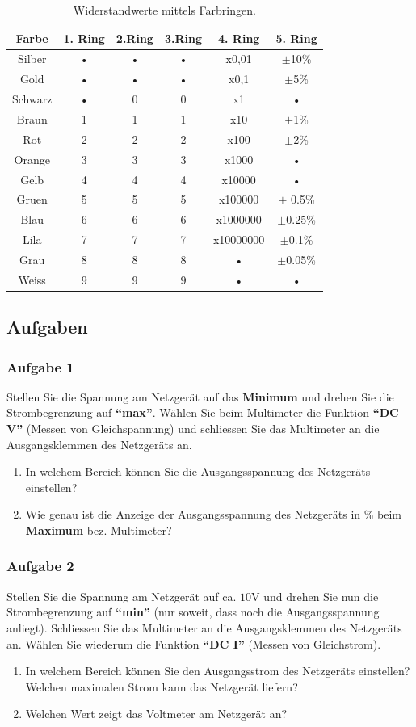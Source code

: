 \begin{table}[H]
\centering
\begin{tabular}{cccccc}\hline
Farbe &1. Ring &2.Ring &3.Ring &4. Ring &5. Ring\\\hline
Silber&•& •& •&x0,01& $\pm$10\%\\
Gold&•& •& •& x0,1& $\pm$5\%\\
Schwarz&•& 0& 0&x1 &•\\
Braun&1& 1& 1&x10& $\pm$1\%\\
Rot&2 &2 &2& x100& $\pm$2\%\\
Orange&3 &3& 3&x1000& •\\
Gelb&4 &4 &4& x10000& •\\
Gruen&5 &5& 5&x100000&$\pm$ 0.5\%\\
Blau&6 &6 &6&x1000000&$\pm$0.25\%\\
Lila&7 &7& 7&x10000000&$\pm$0.1\%\\
Grau&8 &8& 8&•&$\pm$0.05\%\\
Weiss& 9& 9& 9& •& •\\\hline
\end{tabular}
\caption{Widerstandwerte mittels Farbringen.}
\end{table}
\subsection{Aufgaben}
\subsubsection{Aufgabe 1}
Stellen Sie die Spannung am Netzgerät auf das \textbf{Minimum} und drehen Sie die Strombegrenzung auf \textbf{``max''}. Wählen Sie beim Multimeter die Funktion \textbf{``DC V''} (Messen von Gleichspannung) und schliessen Sie das Multimeter an die Ausgangsklemmen des Netzgeräts an. 
\begin{enumerate}[$a)$]
\item In welchem Bereich können Sie die Ausgangsspannung des Netzgeräts einstellen? 
\item Wie genau ist die Anzeige der Ausgangsspannung des Netzgeräts in \% beim \textbf{Maximum} bez. Multimeter?
\end{enumerate}
\subsubsection{Aufgabe 2}
Stellen Sie die Spannung am Netzgerät auf ca. $10\text{V}$ und drehen Sie nun die Strombegrenzung auf \textbf{``min''} (nur soweit, dass noch die Ausgangsspannung anliegt). Schliessen Sie das Multimeter an die Ausgangsklemmen des Netzgeräts an. Wählen Sie wiederum die Funktion \textbf{``DC I''} (Messen von Gleichstrom).
\begin{enumerate}[$a)$]
\item In welchem Bereich können Sie den Ausgangsstrom des Netzgeräts einstellen? Welchen maximalen Strom kann das Netzgerät liefern? 
\item Welchen Wert zeigt das Voltmeter am Netzgerät an?
\end{enumerate}
